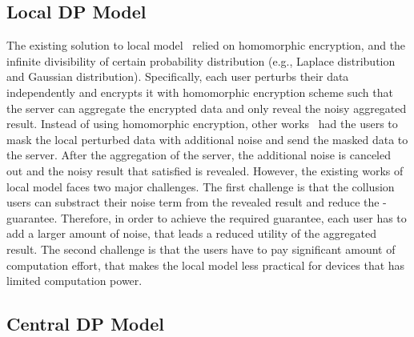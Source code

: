 \subsection{Local DP Model}
\label{subsec:LocallDPModel}
The existing solution to local \differentialprivacy model~\cite{rastogi2010differentially,Elaine2011Privacy,acs2011have, chan2012privacy,bindschaedler2017achieving,shi2017distributed,truex2019hybrid} relied on homomorphic encryption, \smpc and the infinite divisibility of certain probability distribution (e.g., Laplace distribution~\cite{kotz2001laplace} and Gaussian distribution). Specifically, each user perturbs their data independently and encrypts it with homomorphic encryption scheme such that the server can aggregate the encrypted data and only reveal the noisy aggregated result.
Instead of using homomorphic encryption, other works~\cite{byrd2020differentially,ghazi2021differentially,balle2020private} had the users to mask the local perturbed data with additional noise and send the masked data to the server. After the aggregation of the server, the additional noise is canceled out and the noisy result that satisfied \differentialprivacy is revealed.
However, the existing works of local \differentialprivacy model faces two major challenges. The first challenge is that the collusion users can substract their noise term from the revealed result and reduce the \differentialprivacy-guarantee. Therefore, in order to achieve the required \differentialprivacy guarantee, each user has to add a larger amount of noise, that leads a reduced utility of the aggregated result.
The second challenge is that the users have to pay significant amount of computation effort, that makes the local \differentialprivacy model less practical for devices that has limited computation power.


\subsection{Central DP Model}
\label{subsec:CentralDPModel}

